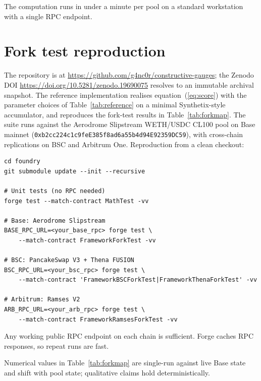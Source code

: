 \documentclass[11pt,a4paper]{article}
\theoremstyle{cgdefinition}
\theoremstyle{cgplain}
\theoremstyle{cgremark}
\begin{document}
The computation runs in under a minute per pool on a standard workstation with a single RPC endpoint.

\section{Fork test reproduction}\label{app:forktest}

The repository is at \url{https://github.com/g4nc0r/constructive-gauges}; the Zenodo DOI \url{https://doi.org/10.5281/zenodo.19690075} resolves to an immutable archival snapshot. The reference implementation realises equation~(\ref{eq:score}) with the parameter choices of Table~\ref{tab:reference} on a minimal Synthetix-style accumulator, and reproduces the fork-test results in Table~\ref{tab:forkmap}. The suite runs against the Aerodrome Slipstream WETH/USDC CL100 pool on Base mainnet (\texttt{0xb2cc224c1c9feE385f8ad6a55b4d94E92359DC59}), with cross-chain replications on BSC and Arbitrum One. Reproduction from a clean checkout:

\begin{center}\begin{minipage}{0.85\textwidth}\begin{verbatim}
cd foundry
git submodule update --init --recursive

# Unit tests (no RPC needed)
forge test --match-contract MathTest -vv

# Base: Aerodrome Slipstream
BASE_RPC_URL=<your_base_rpc> forge test \
    --match-contract FrameworkForkTest -vv

# BSC: PancakeSwap V3 + Thena FUSION
BSC_RPC_URL=<your_bsc_rpc> forge test \
    --match-contract 'FrameworkBSCForkTest|FrameworkThenaForkTest' -vv

# Arbitrum: Ramses V2
ARB_RPC_URL=<your_arb_rpc> forge test \
    --match-contract FrameworkRamsesForkTest -vv
\end{verbatim}\end{minipage}\end{center}

Any working public RPC endpoint on each chain is sufficient. Forge caches RPC responses, so repeat runs are fast.

Numerical values in Table~\ref{tab:forkmap} are single-run against live Base state and shift with pool state; qualitative claims hold deterministically.
\end{document}
